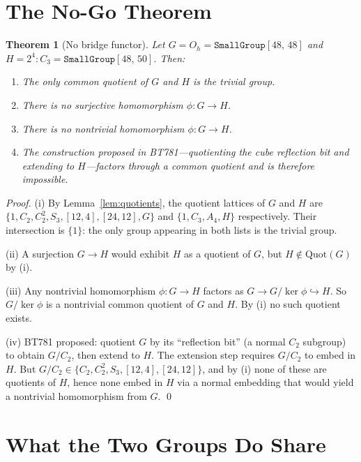 \documentclass[11pt]{amsart}
\newtheorem{theorem}{Theorem}
\newcommand{\SmallGroup}[2]{\texttt{SmallGroup}[#1,\,#2]}
\begin{document}
\section{The No-Go Theorem}

\begin{theorem}[No bridge functor]
\label{thm:no-go}
Let $G = O_h = \SmallGroup{48}{48}$ and $H = 2^4{:}C_3 = \SmallGroup{48}{50}$.
Then:
\begin{enumerate}
  \item[(i)] The only common quotient of $G$ and $H$ is the trivial group.
  \item[(ii)] There is no surjective homomorphism $\phi\colon G \to H$.
  \item[(iii)] There is no nontrivial homomorphism $\phi\colon G \to H$.
  \item[(iv)] The construction proposed in BT781---quotienting the cube reflection
    bit and extending to $H$---factors through a common quotient and is therefore
    impossible.
\end{enumerate}
\end{theorem}

\begin{proof}
(i) By Lemma~\ref{lem:quotients}, the quotient lattices of $G$ and $H$ are
$\{1,C_2,C_2^2,S_3,[12,4],[24,12],G\}$ and $\{1,C_3,A_4,H\}$ respectively.
Their intersection is $\{1\}$: the only group appearing in both lists is the
trivial group. \medskip

(ii) A surjection $G \to H$ would exhibit $H$ as a quotient of $G$, but $H \notin \mathrm{Quot}(G)$ by (i).
\medskip

(iii) Any nontrivial homomorphism $\phi\colon G \to H$ factors as $G \to G/\ker\phi \hookrightarrow H$.
So $G/\ker\phi$ is a nontrivial common quotient of $G$ and $H$.  By (i) no such quotient
exists.
\medskip

(iv) BT781 proposed: quotient $G$ by its ``reflection bit'' (a normal $C_2$ subgroup) to
obtain $G/C_2$, then extend to $H$.  The extension step requires $G/C_2$ to embed in $H$.
But $G/C_2 \in \{C_2, C_2^2, S_3, [12,4], [24,12]\}$, and by (i) none of these are
quotients of $H$, hence none embed in $H$ via a normal embedding that would yield a
nontrivial homomorphism from $G$. \hfill\qed
\end{proof}

\section{What the Two Groups Do Share}
\end{document}
